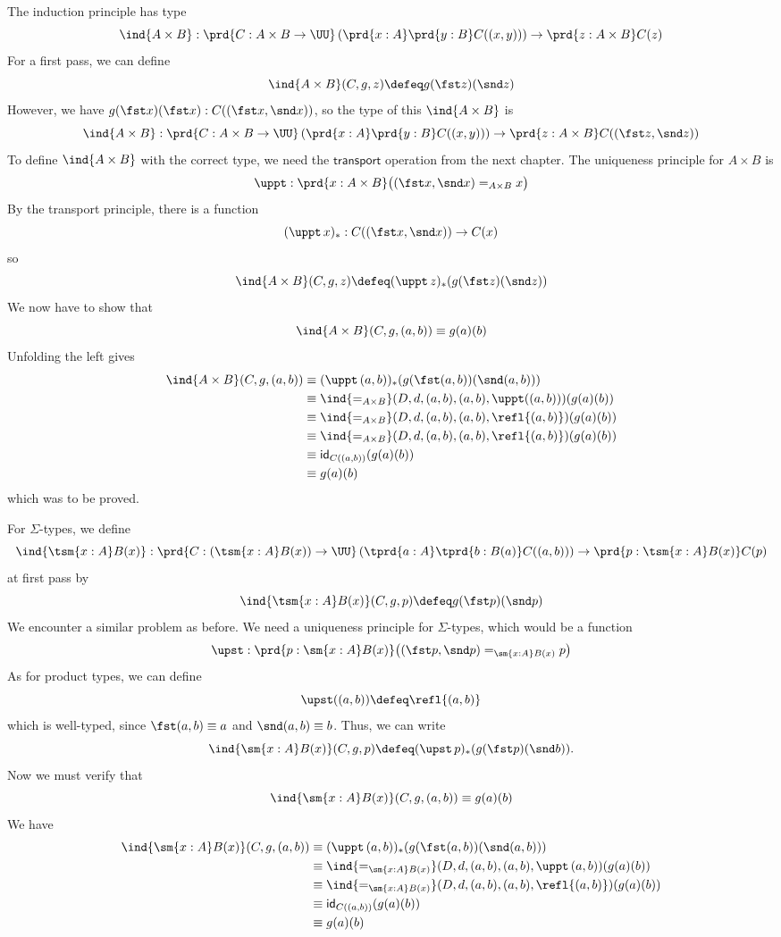 \soln The induction principle has type
\[
  \ind{A\times B} : \prd{C: A\times B \to \UU}\left(\prd{x:A}\prd{y:B}C((x,
    y))\right) \to \prd{z:A\times B}C(z)
\]
For a first pass, we can define
\[
  \ind{A\times B}(C, g, z)
  \defeq
  g(\fst z)(\snd z)
\]
However, we have $g(\fst x)(\fst x) : C((\fst x, \snd x))$, so the type of this
$\ind{A \times B}$ is
\[
  \ind{A\times B} : \prd{C: A\times B \to \UU}\left(\prd{x:A}\prd{y:B}C((x,
    y))\right) \to \prd{z:A\times B}C((\fst z, \snd z))
\]
To define $\ind{A \times B}$ with the correct type, we need the
$\mathsf{transport}$ operation from the next chapter.  The uniqueness principle
for $A \times B$ is
\[
  \uppt : \prd{x : A \times B} \big((\fst x, \snd x) =_{A \times B} x\big)
\]
By the transport principle, there is a function
\[
  (\uppt\, x)_{*} : C((\fst x, \snd x)) \to C(x)
\]
so
\[
  \ind{A \times B}(C, g, z)
  \defeq
  (\uppt\, z)_{*}(g(\fst z)(\snd z))
\]
We now have to show that
\[
  \ind{A \times B}(C, g, (a, b)) 
  \equiv g(a)(b)
\]
Unfolding the left gives
\begin{align*}
  \ind{A \times B}(C, g, (a, b)) 
  &\equiv
  (\uppt\, (a, b))_{*}(g(\fst (a, b))(\snd (a, b)))
  \\&\equiv
  \ind{=_{A \times B}}(D, d, (a, b), (a, b), \uppt((a, b)))(g(a)(b))
  \\&\equiv
  \ind{=_{A \times B}}(D, d, (a, b), (a, b), \refl{(a, b)})
  (g(a)(b))
  \\&\equiv
  \ind{=_{A \times B}}(D, d, (a, b), (a, b), \refl{(a, b)})
  (g(a)(b))
  \\&\equiv
  \mathsf{id}_{C((a, b))}(g(a)(b))
  \\&\equiv
  g(a)(b)
\end{align*}
which was to be proved.

For $\Sigma$-types, we define
\[
  \ind{\tsm{x:A}B(x)} : \prd{C:(\tsm{x:A}B(x)) \to \UU}
  \left(\tprd{a:A}\tprd{b:B(a)}C((a, b))\right) \to \prd{p: \tsm{x:A}B(x)}C(p)
\]
at first pass by
\[
  \ind{\tsm{x:A}B(x)}(C, g, p)
  \defeq
  g(\fst p)(\snd p)
\]
We encounter a similar problem as before.  We need a uniqueness principle for
$\Sigma$-types, which would be a function
\[
  \upst : \prd{p : \sm{x:A}B(x)} \big(
    (\fst p, \snd p) =_{\sm{x:A}B(x)} p
  \big)
\]
As for product types, we can define
\[
  \upst((a, b)) \defeq \refl{(a, b)}
\]
which is well-typed, since $\fst(a, b) \equiv a$ and $\snd(a, b) \equiv b$.
Thus, we can write
\[
  \ind{\sm{x:A}B(x)}(C, g, p) \defeq (\upst\, p)_{*}(g(\fst p)(\snd b)).
\]
Now we must verify that
\[
  \ind{\sm{x:A}B(x)}(C, g, (a, b)) \equiv g(a)(b)
\]
We have
\begin{align*}
  \ind{\sm{x:A}B(x)}(C, g, (a, b))
  &\equiv
  (\uppt\, (a, b))_{*}(g(\fst(a, b))(\snd(a, b)))
  \\&\equiv
  \ind{=_{\sm{x:A}B(x)}}(D, d, (a, b), (a, b), \uppt\, (a, b))
  (g(a)(b))
  \\&\equiv
  \ind{=_{\sm{x:A}B(x)}}(D, d, (a, b), (a, b), \refl{(a, b)})
  (g(a)(b))
  \\&\equiv
  \mathsf{id}_{C((a, b))}
  (g(a)(b))
  \\&\equiv
  g(a)(b)
\end{align*}

